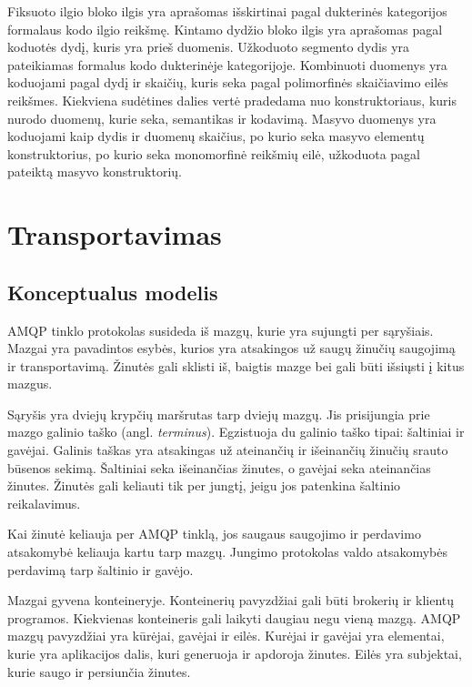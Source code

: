 \documentclass[12pt, a4paper, lithuanian]{article}
\begin{document}
    Fiksuoto ilgio bloko ilgis yra aprašomas išskirtinai pagal dukterinės kategorijos formalaus kodo ilgio reikšmę.
    Kintamo dydžio bloko ilgis yra aprašomas pagal koduotės dydį, kuris yra prieš duomenis. Užkoduoto segmento dydis yra pateikiamas formalus kodo dukterinėje kategorijoje. Kombinuoti duomenys yra koduojami pagal dydį ir skaičių, kuris seka pagal polimorfinės skaičiavimo eilės reikšmes.
    Kiekviena sudėtines dalies vertė pradedama nuo konstruktoriaus, kuris nurodo duomenų, kurie seka, semantikas ir kodavimą.
    Masyvo duomenys yra koduojami kaip dydis ir duomenų skaičius, po kurio seka masyvo elementų konstruktorius, po kurio seka monomorfinė reikšmių eilė, užkoduota pagal pateiktą masyvo konstruktorių.

    \section{Transportavimas}

    \subsection{Konceptualus modelis}

    AMQP tinklo protokolas \cite{OASISAdv34:online} susideda iš mazgų, kurie yra sujungti per sąryšiais.
    Mazgai yra pavadintos esybės, kurios yra atsakingos už saugų žinučių saugojimą ir transportavimą.
    Žinutės gali sklisti iš, baigtis mazge bei gali būti išsiųsti į kitus mazgus.

    Sąryšis yra dviejų krypčių maršrutas tarp dviejų mazgų. Jis prisijungia prie mazgo galinio taško (angl. \textit{terminus}).
    Egzistuoja du galinio taško tipai: šaltiniai ir gavėjai.
    Galinis taškas yra atsakingas už ateinančių ir išeinančių žinučių srauto būsenos sekimą.
    Šaltiniai seka išeinančias žinutes, o gavėjai seka ateinančias žinutes.
    Žinutės gali keliauti tik per jungtį, jeigu jos patenkina šaltinio reikalavimus.

    Kai žinutė keliauja per AMQP tinklą, jos saugaus saugojimo ir perdavimo atsakomybė keliauja kartu tarp mazgų.
    Jungimo protokolas valdo atsakomybės perdavimą tarp šaltinio ir gavėjo.

    Mazgai gyvena konteineryje.
    Konteinerių pavyzdžiai gali būti brokerių ir klientų programos.
    Kiekvienas konteineris gali laikyti daugiau negu vieną mazgą.
    AMQP mazgų pavyzdžiai yra kūrėjai, gavėjai ir eilės.
    Kurėjai ir gavėjai yra elementai, kurie yra aplikacijos dalis, kuri generuoja ir apdoroja žinutes.
    Eilės yra subjektai, kurie saugo ir persiunčia žinutes.
\end{document}
